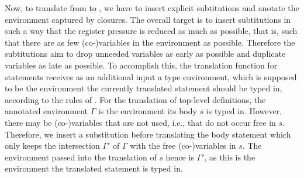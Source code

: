 Now, to translate from \targetred{} to \targetsub{}, we have to insert explicit subtitutions and anotate the environment captured by closures.
The overall target is to insert subtitutions in such a way that the register pressure is reduced as much as possible, that is, such that there are as few (co-)variables in the environment as possible.
Therefore the subtitutions aim to drop unneeded variables as early as possible and duplicate variables as late as possible.
To accomplish this, the translation function for statements receives as an additional input a type environment, which is supposed to be the environment the currently translated statement should be typed in, according to the rules of \targetsub.
For the translation of top-level definitions, the annotated environment $\Gamma$ is the environment its body $s$ is typed in.
However, there may be (co-)variables that are not used, i.e., that do not occur free in $s$.
Therefore, we insert a substitution before translating the body statement which only keeps the intersection $\Gamma'$ of $\Gamma$ with the free (co-)variables in $s$.
The environment passed into the translation of $s$ hence is $\Gamma'$, as this is the environment the translated statement is typed in.

